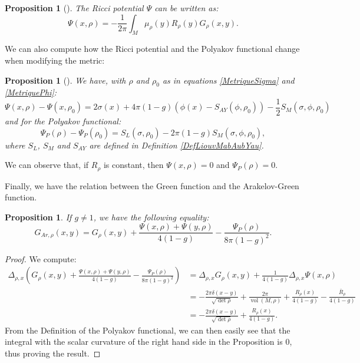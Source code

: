 \documentclass{article}
\newtheorem{Proposition}[theorem]{Proposition}
\theoremstyle{definition}
\theoremstyle{remark}
\DeclareMathOperator{\vol}{vol}
\begin{document}
\begin{Proposition}[{\cite[eq. (3.45)]{FERRARI-GravitaionMabuchi}}]  \label{Pr: RicciGreen}
    The Ricci potential \(\Psi\) can be written as:  
    $$\Psi(x,\rho)=-\frac{1}{2\pi}\int_{M}\mu_{\rho}(y)R_{\rho}(y)G_{\rho}(x,y).$$  
\end{Proposition}
We can also compute how the Ricci potential and the Polyakov functional change when modifying the metric:
\begin{Proposition}[{\cite[eq. (3.41), (3.46)]{FERRARI-GravitaionMabuchi}}]\label{RicVar}
    We have, with $\rho$ and $\rho_{0}$ as in equations \eqref{MetriqueSigma} and \eqref{MetriquePhi}:  
    $$\Psi(x,\rho)-\Psi(x,\rho_{0})=2\sigma(x)+4\pi(1-g)\left(\phi(x)-S_{AY}(\phi,\rho_{0}) \right)-\frac{1}{2}S_{M}(\sigma,\phi,\rho_{0})$$ 
    and for the Polyakov functional:  
    $$\Psi_{P}(\rho)-\Psi_{P}(\rho_{0})=S_{L}(\sigma,\rho_{0})-2\pi(1-g)S_{M}(\sigma,\phi,\rho_{0}),$$
    where $S_{L}$, $S_{M}$ and $S_{AY}$ are defined in Definition \ref{DefLiouvMabAubYau}.
\end{Proposition}
    We can observe that, if $R_{\rho}$ is constant, then $\Psi(x,\rho)=0$ and $\Psi_{P}(\rho)=0.$
    
Finally, we have the relation between the Green function and the Arakelov-Green function. 
\begin{Proposition}
    If $g\neq1$, we have the following equality: 
    $$G_{Ar,\rho}(x,y)=G_{\rho}(x,y)+\frac{\Psi(x,\rho)+\Psi(y,\rho)}{4(1-g)}-\frac{\Psi_{P}(\rho)}{8\pi(1-g)^{2}}.$$
\end{Proposition}

\begin{proof}
    We compute: \begin{align*}
        \Delta_{\rho,x}\left(G_{\rho}(x,y)+\frac{\Psi(x,\rho)+\Psi(y,\rho)}{4(1-g)}-\frac{\Psi_{P}(\rho)}{8\pi(1-g)^{2}}\right)&=\Delta_{\rho,x}G_{\rho}(x,y)+\frac{1}{4(1-g)}\Delta_{\rho,x}\Psi(x,\rho)\\&=-\frac{2\pi\delta(x-y)}{\sqrt{\det\rho}}+\frac{2\pi}{\vol(M,\rho)}+\frac{R_{\rho}(x)}{4(1-g)}-\frac{\bar{R}_{\rho}}{4(1-g)}\\&=-\frac{2\pi\delta(x-y)}{\sqrt{\det\rho}}+\frac{R_{\rho}(x)}{4(1-g)}.
    \end{align*}
    From the Definition of the Polyakov functional, we can then easily see that the integral with the scalar curvature of the right hand side in the Proposition is $0$, thus proving the result.
\end{proof}
\end{document}
